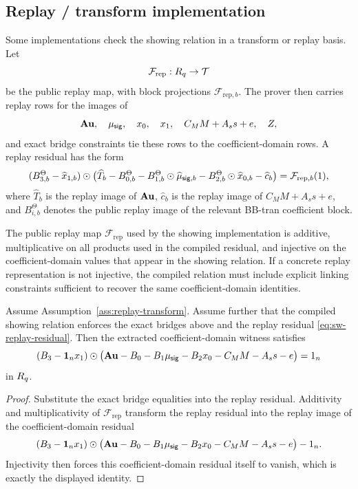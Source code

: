 \subsection{Replay / transform implementation}
\label{subsec:replay-implementation}
Some implementations check the showing relation in a transform or replay basis.  Let
\[
  \mathcal F_{\mathrm{rep}}:R_q\to\mathcal T
\]
be the public replay map, with block projections \(\mathcal F_{\mathrm{rep},b}\).  The prover then carries replay rows
for the images of
\[
  \mathbf{A}\mathbf{u},
  \quad
  \mu_{\mathsf{sig}},
  \quad
  x_0,
  \quad
  x_1,
  \quad
  C_MM+A_s s+e,
  \quad
  Z,
\]
and exact bridge constraints tie these rows to the coefficient-domain rows.  A replay residual has the form
\begin{equation}
  (B_{3,b}^{\Theta}-\widehat x_{1,b})\odot
  \bigl(\widehat T_b-B_{0,b}^{\Theta}-B_{1,b}^{\Theta}\odot \widehat\mu_{\mathsf{sig},b}
  -B_{2,b}^{\Theta}\odot\widehat x_{0,b}-\widehat c_b\bigr)
  =\mathcal F_{\mathrm{rep},b}(1),
  \label{eq:sw-replay-residual}
\end{equation}
where \(\widehat T_b\) is the replay image of \(\mathbf{A}\mathbf{u}\), \(\widehat c_b\) is the replay image of
\(C_MM+A_s s+e\), and \(B_{i,b}^{\Theta}\) denotes the public replay image of the relevant BB-tran coefficient block.

\begin{assumption}\label{ass:replay-transform}
The public replay map \(\mathcal F_{\mathrm{rep}}\) used by the showing implementation is additive, multiplicative on
all products used in the compiled residual, and injective on the coefficient-domain values that appear in the showing
relation.  If a concrete replay representation is not injective, the compiled relation must include explicit linking
constraints sufficient to recover the same coefficient-domain identities.
\end{assumption}

\begin{theorem}
\label{thm:replay-to-coeff}
Assume Assumption~\ref{ass:replay-transform}.  Assume further that the compiled showing relation enforces the
exact bridges above and the replay residual \eqref{eq:sw-replay-residual}.  Then the extracted coefficient-domain
witness satisfies
\[
  (B_3-\mathbf 1_nx_1)\odot
  \bigl(\mathbf{A}\mathbf{u}-B_0-B_1\mu_{\mathsf{sig}}-B_2x_0-C_MM-A_s s-e\bigr)=1_n
\]
in \(R_q\).
\end{theorem}

\begin{proof}
Substitute the exact bridge equalities into the replay residual.  Additivity and multiplicativity of
\(\mathcal F_{\mathrm{rep}}\) transform the replay residual into the replay image of the coefficient-domain residual
\[
  (B_3-\mathbf 1_nx_1)\odot
  \bigl(\mathbf{A}\mathbf{u}-B_0-B_1\mu_{\mathsf{sig}}-B_2x_0-C_MM-A_s s-e\bigr)-1_n.
\]
Injectivity then forces this coefficient-domain residual itself to vanish, which is exactly the displayed identity.
\end{proof}

